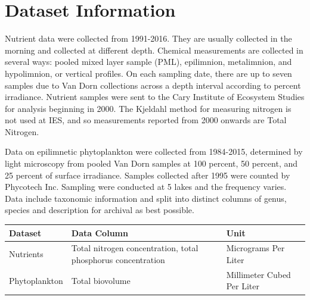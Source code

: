 \documentclass[12pt,]{article}
\begin{document}
\newpage

\section{Dataset Information}\label{dataset-information}

Nutrient data were collected from 1991-2016. They are usually collected
in the morning and collected at different depth. Chemical measurements
are collected in several ways: pooled mixed layer sample (PML),
epilimnion, metalimnion, and hypolimnion, or vertical profiles. On each
sampling date, there are up to seven samples due to Van Dorn collections
across a depth interval according to percent irradiance. Nutrient
samples were sent to the Cary Institute of Ecosystem Studies for
analysis beginning in 2000. The Kjeldahl method for measuring nitrogen
is not used at IES, and so measurements reported from 2000 onwards are
Total Nitrogen.

Data on epilimnetic phytoplankton were collected from 1984-2015,
determined by light microscopy from pooled Van Dorn samples at 100
percent, 50 percent, and 25 percent of surface irradiance. Samples
collected after 1995 were counted by Phycotech Inc. Sampling were
conducted at 5 lakes and the frequency varies. Data include taxonomic
information and split into distinct columns of genus, species and
description for archival as best possible.

\begin{longtable}[]{@{}lll@{}}
\toprule
\begin{minipage}[b]{0.13\columnwidth}\raggedright\strut
Dataset\strut
\end{minipage} & \begin{minipage}[b]{0.54\columnwidth}\raggedright\strut
Data Column\strut
\end{minipage} & \begin{minipage}[b]{0.24\columnwidth}\raggedright\strut
Unit\strut
\end{minipage}\tabularnewline
\midrule
\endhead
\begin{minipage}[t]{0.13\columnwidth}\raggedright\strut
Nutrients\strut
\end{minipage} & \begin{minipage}[t]{0.54\columnwidth}\raggedright\strut
Total nitrogen concentration, total phosphorus concentration\strut
\end{minipage} & \begin{minipage}[t]{0.24\columnwidth}\raggedright\strut
Micrograms Per Liter\strut
\end{minipage}\tabularnewline
\begin{minipage}[t]{0.13\columnwidth}\raggedright\strut
Phytoplankton\strut
\end{minipage} & \begin{minipage}[t]{0.54\columnwidth}\raggedright\strut
Total biovolume\strut
\end{minipage} & \begin{minipage}[t]{0.24\columnwidth}\raggedright\strut
Millimeter Cubed Per Liter\strut
\end{minipage}\tabularnewline
\bottomrule
\end{longtable}
\end{document}
